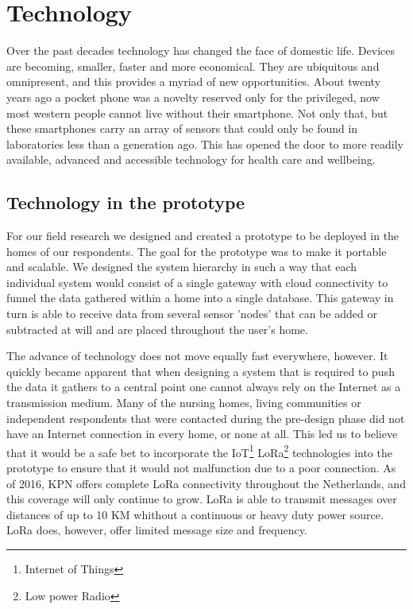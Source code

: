 \documentclass{below-ext}
\begin{document}
\section{Technology}
Over the past decades technology has changed the face of domestic life. Devices are becoming, smaller, faster and more economical. They are ubiquitous and omnipresent, and this provides a myriad of new opportunities. About twenty years ago a pocket phone was a novelty reserved only for the privileged, now most western people cannot live without their smartphone. Not only that, but these smartphones carry an array of sensors that could only be found in laboratories less than a generation ago. This has opened the door to more readily available, advanced and accessible technology for health care and wellbeing.

\subsection{Technology in the prototype}

For our field research we designed and created a prototype to be deployed in the homes of our respondents. The goal for the prototype was to make it portable and scalable. We designed the system hierarchy in such a way that each individual system would consist of a single gateway with cloud connectivity to funnel the data gathered within a home into a single database. This gateway  in turn is able to receive data from several sensor 'nodes' that can be added or subtracted at will and are placed throughout the user's home. 
 
The advance of technology does not move equally fast everywhere, however. It quickly became apparent that when designing a system that is required to push the data it gathers to a central point one cannot always rely on the Internet as a transmission medium. Many of the nursing homes, living communities or independent respondents that were contacted during the pre-design phase did not have an Internet connection in every home, or none at all. This led us to believe that it would be a safe bet to incorporate the IoT\footnote{Internet of Things} LoRa\footnote{Low power Radio} technologies into the prototype to ensure that it would not malfunction due to a poor connection. As of 2016, KPN offers complete LoRa connectivity throughout the Netherlands, and this coverage will only continue to grow. LoRa is able to transmit messages over distances of up to 10 KM whithout a continuous or heavy duty power source. LoRa does, however, offer limited message size and frequency. 
\end{document}
